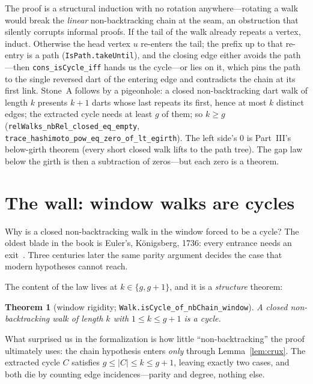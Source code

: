 \documentclass[11pt]{article}
\newtheorem{theorem}{Theorem}
\newcommand{\lean}[1]{\texttt{#1}}
\begin{document}
The proof is a structural induction with no rotation anywhere---rotating a walk would break
the \emph{linear} non-backtracking chain at the seam, an obstruction that silently corrupts
informal proofs. If the tail of the walk already repeats a vertex, induct. Otherwise the
head vertex $u$ re-enters the tail; the prefix up to that re-entry is a path
(\lean{IsPath.takeUntil}), and the closing edge either avoids the path---then
\lean{cons\_isCycle\_iff} hands us the cycle---or lies on it, which pins the path to the
single reversed dart of the entering edge and contradicts the chain at its first link.
Stone~A follows by a pigeonhole: a closed non-backtracking dart walk of length $k$ presents
$k+1$ darts whose last repeats its first, hence at most $k$ distinct edges; the extracted
cycle needs at least $g$ of them; so $k \ge g$
(\lean{relWalks\_nbRel\_closed\_eq\_empty}, \lean{trace\_hashimoto\_pow\_eq\_zero\_of\_lt\_egirth}).
The left side's $0$ is Part~III's below-girth theorem (every short closed walk lifts to the
path tree). The gap law below the girth is then a subtraction of zeros---but each zero is a
theorem.

\section{The wall: window walks are cycles}
\label{sec:wall}

Why is a closed non-backtracking walk in the window forced to be a cycle? The oldest blade
in the book is Euler's, K\"onigsberg, 1736: every entrance needs an exit~\cite{Euler1736}. Three centuries later the same parity argument decides the case that
modern hypotheses cannot reach.

The content of the law lives at $k \in \{g, g+1\}$, and it is a \emph{structure} theorem:

\begin{theorem}[window rigidity; \lean{Walk.isCycle\_of\_nbChain\_window}]
\label{thm:rigidity}
A closed non-backtracking walk of length $k$ with $1 \le k \le g+1$ is a cycle.
\end{theorem}

What surprised us in the formalization is how little ``non-backtracking'' the proof
ultimately uses: the chain hypothesis enters \emph{only} through Lemma~\ref{lem:crux}. The
extracted cycle $C$ satisfies $g \le |C| \le k \le g+1$, leaving exactly two cases, and both
die by counting edge incidences---parity and degree, nothing else.
\end{document}
